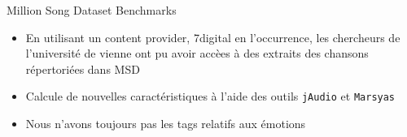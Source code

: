 \documentclass{beamer}
\begin{document}
\begin{frame}{Million Song Dataset Benchmarks}
    \begin{itemize}
        \item En utilisant un content provider, 7digital en l'occurrence, les
            chercheurs de l'université de vienne ont pu avoir accèes à des
            extraits des chansons répertoriées dans MSD
        \item Calcule de nouvelles caractéristiques à l'aide des outils
            \texttt{jAudio} et \texttt{Marsyas}
        \item Nous n'avons toujours pas les tags relatifs aux émotions
    \end{itemize}

\end{frame}

\end{document}
